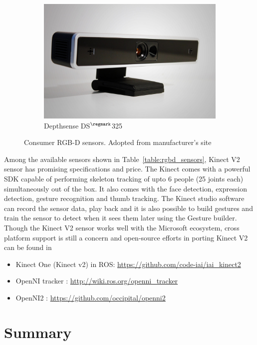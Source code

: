 \begin{figure}
\begin{subfigure}[b]{0.33\textwidth}
\label{fig:creative_senz3d}
\end{subfigure}%
\begin{subfigure}[b]{0.33\textwidth}
\includegraphics[width=\textwidth]{assets/depthsense_DS311.jpg}
\caption{Depthsense DS$^{\regmark}$325}
\label{fig:depthsense}
\end{subfigure}
\caption[Consumer RGB-D sensors]{Consumer RGB-D sensors. {Adopted from manufacturer's site}}
\label{fig:rgbd_sensors}
\end{figure}
	Among the available sensors shown in Table~\ref{table:rgbd_sensors}, Kinect V2\cite{Kinect2014} sensor has promising specifications and price. The Kinect comes with a powerful SDK\cite{KinectSDK2014} capable of performing skeleton tracking of upto 6 people (25 joints each) simultaneously out of the box. It also comes with the face detection, expression detection, gesture recognition and thumb tracking. The Kinect studio software can record the sensor data, play back and it is also possible to build gestures and train the sensor to detect when it sees them later using the Gesture builder. Though the Kinect V2 sensor works well with the Microsoft ecosystem, cross platform support is still a concern and open-source efforts in porting Kinect V2 can be found in
\begin{itemize}
\item Kinect One (Kinect v2) in ROS: \url{https://github.com/code-iai/iai_kinect2}
\item OpenNI tracker : \url{http://wiki.ros.org/openni_tracker}
\item OpenNI2 : \url{https://github.com/occipital/openni2}
\end{itemize}



\section{Summary}